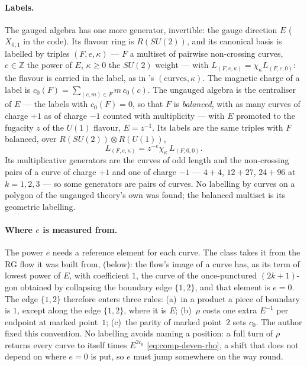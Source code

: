 \documentclass[11pt]{amsart}
\newcommand\bZ{\mathbb{Z}}
\theoremstyle{remark}
\begin{document}
\paragraph{Labels.}  The gauged algebra has one more generator, invertible:
the gauge direction $E$ ($X_{0,1}$ in the code).  Its flavour ring is
$R(SU(2))$, and its canonical basis is labelled by triples $(F,e,\kappa)$ ---
$F$ a multiset of pairwise non-crossing curves, $e\in\bZ$ the power of $E$,
$\kappa\ge0$ the $SU(2)$ weight --- with $L_{(F,e,\kappa)}=\chi_\kappa
L_{(F,e,0)}$: the flavour is carried in the label, as in 's
$(\text{curves},\kappa)$.  The magnetic charge of a
label is $c_0(F)=\sum_{(c,m)\in F}m\,c_0(c)$.  The ungauged algebra
 is the centraliser of $E$ --- the labels with
$c_0(F)=0$, so that $F$ is \emph{balanced}, with as many curves of charge
$+1$ as of charge $-1$ counted with multiplicity --- with $E$ promoted to the
fugacity $z$ of the $U(1)$ flavour, $E=z^{-1}$.  Its labels are the same
triples with $F$ balanced, over $R(SU(2))\otimes R(U(1))$,
\begin{equation}\label{eq:comp-deven-lift}
  L_{(F,e,\kappa)}=z^{-e}\chi_\kappa\,L_{(F,0,0)}.
\end{equation}
Its multiplicative generators are the curves of odd length and the
non-crossing pairs of a curve of charge $+1$ and one of charge $-1$ ---
$4+4$, $12+27$, $24+96$ at $k=1,2,3$ --- so some generators are pairs of
curves.  No labelling by curves on a polygon of the ungauged theory's own was
found; the balanced multiset is its geometric labelling.

\paragraph{Where $e$ is measured from.}  The power $e$ needs a reference
element for each curve.  The class takes it from the RG flow it was built
from,  (below): the flow's image of a curve has,
as its term of lowest power of $E$, with coefficient $1$, the curve of the
once-punctured $(2k+1)$-gon obtained by collapsing the boundary edge
$\{1,2\}$, and that element is $e=0$.  The edge $\{1,2\}$ therefore enters
three rules: (a)~in a product a piece of boundary is $1$, except along the
edge $\{1,2\}$, where it is $E$; (b)~$\rho$ costs one extra $E^{-1}$ per
endpoint at marked point~$1$; (c)~the parity of marked point~$2$ sets $c_0$.
The author fixed this convention.
No labelling avoids naming a position: a full turn of $\rho$ returns every
curve to itself times $E^{2c_0}$ \eqref{eq:comp-deven-rho}, a shift that does
not depend on where $e=0$ is put, so $e$ must jump somewhere on the way round.
\end{document}
